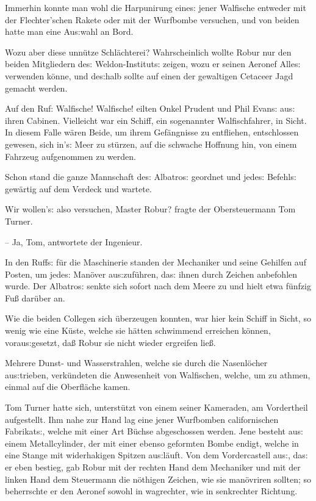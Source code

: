 \documentclass[oneside,12pt]{book}
\newcommand{\s}{s:}
\begin{document}
Immerhin konnte man wohl die Harpunirung eine{\s} jener Walfische
entweder mit der Flechter'schen Rakete oder mit der Wurfbombe
versuchen, und von beiden hatte man eine Au{\s}wahl an Bord.

Wozu aber diese unn\"utze Schl\"achterei? Wahrscheinlich wollte Robur
nur den beiden Mitgliedern de{\s} Weldon-Institut{\s} zeigen, wozu er
seinen Aeronef Alle{\s} verwenden k\"onne, und de{\s}halb sollte auf
einen der gewaltigen Cetaceer Jagd gemacht werden.

Auf den Ruf: {\glqq}Walfische! Walfische!{\grqq} eilten Onkel Prudent
und Phil Evan{\s} au{\s} ihren Cabinen. Vielleicht war ein Schiff,
ein sogenannter Walfischfahrer, in Sicht. In diesem Falle w\"aren
Beide, um ihrem Gef\"angnisse zu entfliehen, entschlossen gewesen,
sich in'{\s} Meer zu st\"urzen, auf die schwache Hoffnung hin, von
einem Fahrzeug aufgenommen zu werden.

Schon stand die ganze Mannschaft de{\s} {\glqq}Albatro{\s}{\grqq}
geordnet und jede{\s} Befehl{\s} gew\"artig auf dem Verdeck und
wartete.

{\glqq}Wir wollen'{\s} also versuchen, Master Robur? fragte der
Obersteuermann Tom Turner.

-- Ja, Tom,{\grqq} antwortete der Ingenieur.

In den Ruff{\s} f\"ur die Maschinerie standen der Mechaniker und
seine Gehilfen auf Posten, um jede{\s} Man\"over au{\s}zuf\"uhren,
da{\s} ihnen durch Zeichen anbefohlen wurde. Der
{\glqq}Albatro{\s}{\grqq} senkte sich sofort nach dem Meere zu und
hielt etwa f\"unfzig Fu{\ss} dar\"uber an.

Wie die beiden Collegen sich \"uberzeugen konnten, war hier kein
Schiff in Sicht, so wenig wie eine K\"uste, welche sie h\"atten
schwimmend erreichen k\"onnen, vorau{\s}gesetzt, da{\ss} Robur sie
nicht wieder ergreifen lie{\ss}.

Mehrere Dunst- und Wasserstrahlen, welche sie durch die Nasenl\"ocher
au{\s}trieben, verk\"undeten die Anwesenheit von Walfischen, welche,
um zu athmen, einmal auf die Oberfl\"ache kamen.

Tom Turner hatte sich, unterst\"utzt von einem seiner Kameraden, am
Vordertheil aufgestellt. Ihm nahe zur Hand lag eine jener Wurfbomben
californischen Fabrikat{\s}, welche mit einer Art B\"uchse
abgeschossen werden. Jene besteht au{\s} einem Metallcylinder, der
mit einer ebenso geformten Bombe endigt, welche in eine Stange mit
widerhakigen Spitzen au{\s}l\"auft. Von dem Vordercastell au{\s},
da{\s} er eben bestieg, gab Robur mit der rechten Hand dem Mechaniker
und mit der linken Hand dem Steuermann die n\"othigen Zeichen, wie
sie man\"ovriren sollten; so beherrschte er den Aeronef sowohl in
wagrechter, wie in senkrechter Richtung.
\end{document}
